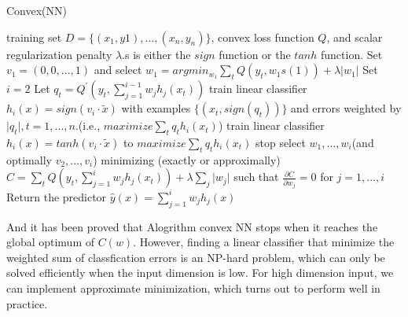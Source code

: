 \documentclass{article}
\begin{document}
\begin{algorithm}[htb]
\caption{Convex(NN)}
\begin{algorithmic}[1]
\REQUIRE
training set $D = \{ (x_{1},y{1}),...,(x_{n},y_{n})\}$, convex loss function $Q$, and scalar regularization penalty $\lambda$.s is either the $sign$ function or the $tanh$ function.
\STATE Set $v_{1} = (0,0,...,1)$ and select $w_{1} = argmin_{w_{1}} \sum_{t} Q(y_{t},w_{1}s(1))+\lambda \lvert w_{1} \rvert$
\STATE Set $i = 2$
  \STATE Let $q_{t} = Q^{'}(y_{t},\sum_{j=1}^{i-1} w_{j}h_{j}(x_t))$
    \STATE train linear classifier $h_{i}(x) = sign(v_{i}\cdot \tilde{x})$ with examples $\{(x_{t}, sign(q_{t}))\}$ and errors weighted by $\lvert q_{t} \rvert, t=1,...,n$.(i.e., $maximize \sum_{t} q_{t}h_{i}(x_{t})$)
    \STATE train linear classifier $h_{i}(x) = tanh(v_{i}\cdot \tilde{x})$ to $maximize \sum_{t} q_{t}h_{i}(x_{t})$
  \ENDIF
    \STATE stop
  \ENDIF
  \STATE select $w_{1},...,w_{i}$(and optimally $v_{2},...,v_{i}$) minimizing (exactly or approximally) $C = \sum_{t}Q(y_{t},\sum_{j=1}^{i} w_{j}h_{j}(x_{t})) + \lambda \sum_{j}\lvert w_{j} \rvert$ such that 
$\frac{\partial C}{\partial w_{j}} = 0$ for $j=1,...,i$
  \STATE Return the predictor $\hat{y}(x) = \sum_{j=1}^{i} w_{j}h_{j}(x)$
\ENDWHILE
\end{algorithmic}
\end{algorithm}

And it has been proved that Alogrithm convex NN stops when it reaches the global optimum of $C(w)$. However, finding a linear classifier that minimize the weighted sum of classfication errors is an NP-hard problem, which can only be solved  efficiently when the input dimension is low. For high dimension input, we can implement approximate minimization, which turns out to perform well in practice.
\end{document}
